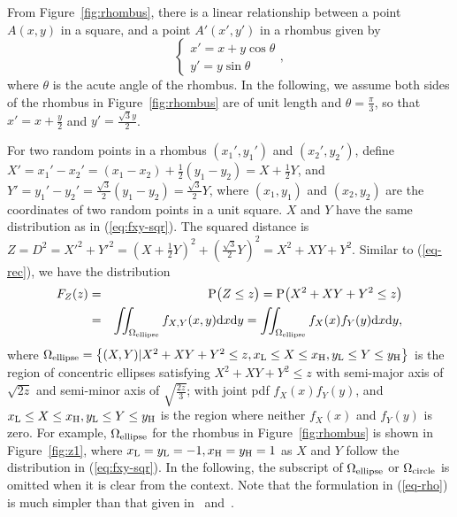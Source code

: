 \documentclass[12pt,draftclsnofoot,onecolumn]{IEEEtran}
\begin{document}
From Figure~\ref{fig:rhombus}, there is a linear relationship between a point $A
(x,y)$ in a square, and a point $A' (x',y')$ in a rhombus given by
\begin{equation}\label{eq:xr}
 \left\{
\begin{array}{lc}
x'=x+y\cos \theta \\
y'=y \sin \theta
\end{array}
\right.,
\end{equation}
where $\theta$ is the acute angle of the rhombus. In the following, we
assume both sides of the rhombus in Figure~\ref{fig:rhombus} are of unit
length and $\theta=\frac{\pi}{3}$, so that $x'=x+\frac{y}{2}$ and $y'=\frac{\sqrt{3}y}{2}$.

For two random points in a rhombus $(x_1',y_1')$ and $(x_2',y_2')$, define
$X'=x_1'-x_2'=\left(x_1-x_2\right)+\frac{1}{2}\left(y_1-y_2\right)=X+\frac{1}{2}
Y$, and
$Y'=y_1'-y_2'=\frac{\sqrt{3}}{2}\left(y_1-y_2\right)=\frac{\sqrt{3}}{2}Y$, where
$(x_1, y_1)$ and $(x_2, y_2)$ are the coordinates of two random points in a
unit square. $X$ and $Y$ have the same distribution as in
(\ref{eq:fxy-sqr}). The squared distance is $Z=D^2=X'^2+Y'^2=\left(X+\frac{1}{2}
Y\right)^2+\left(\frac{\sqrt{3}}{2}Y\right)^2=X^2+XY+Y^2$. Similar to
(\ref{eq-rec}), we have the distribution
\begin{eqnarray}\label{eq-rho}
F_Z(z)&=&{\rm P}\big(Z \leq z \big) = {\rm P}\big(X^2+XY+Y^2 \leq z \big)\nonumber\\
&=&\iint_{\Omega_{\rm ellipse}}f_{X,Y}(x,y){\rm d}x{\rm d}y=
\iint_{\Omega_{\rm ellipse}}f_X(x)f_Y(y){\rm d}x{\rm d}y,
\end{eqnarray}
where $\Omega_{\rm ellipse}=\left\{(X,Y)|X^2+XY+Y^2\leq z, x_{\rm L} \leq X \leq
x_{\rm H}, y_{\rm L}\leq Y \leq y_{\rm H}\right\}$ is the region of concentric ellipses
satisfying $X^2+XY+Y^2\leq z$
with semi-major axis of $\sqrt{2z}$ and semi-minor axis of $\sqrt{\frac{2z}{3}}$;
with joint pdf $f_X(x)f_Y(y)$, and $x_{\rm L} \leq X \leq x_{\rm H}, y_{\rm L}\leq
Y \leq y_{\rm H}$ is the region where neither $f_X(x)$ and $f_Y(y)$ is zero.
For example, $\Omega_{\rm ellipse}$ for the rhombus in Figure~\ref{fig:rhombus}
is shown in Figure~\ref{fig:z1}, where $x_{\rm L}=y_{\rm L}=-1, x_{\rm H}=y_{\rm H}=1$
as $X$ and $Y$ follow the distribution in (\ref{eq:fxy-sqr}).
In the following, the subscript of $\Omega_{\rm ellipse}$ or $\Omega_{\rm circle}$ is
omitted when it is clear from the context.
Note that the formulation in (\ref{eq-rho}) is much simpler than that given in~\cite{zhuang2011random}
and~\cite{zhuang2012geometrical}.
\end{document}
